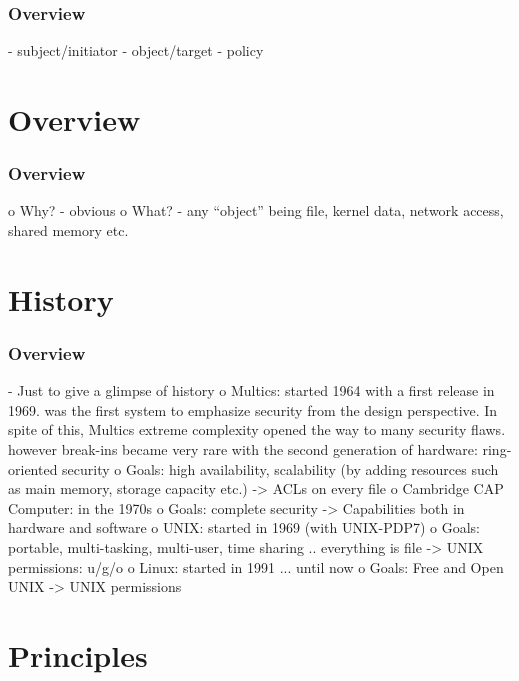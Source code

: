 \begin{frame}
  \frametitle{Overview}

  - subject/initiator
  - object/target
  - policy
\end{frame}

%
%

\section{Overview}


\begin{frame}
  \frametitle{Overview}

  o Why?
    - obvious
  o What?
    - any ``object'' being file, kernel data, network access, shared memory etc.
\end{frame}

%
%

\section{History}


\begin{frame}
  \frametitle{Overview}

  - Just to give a glimpse of history
  o Multics: started 1964 with a first release in 1969.
             was the first system to emphasize security from the design perspective. In spite of this,
             Multics extreme complexity opened the way to many security flaws.
             however break-ins became very rare with the second generation of hardware: ring-oriented security
    o Goals: high availability, scalability (by adding resources such as main memory, storage capacity etc.)
             -> ACLs on every file
  o Cambridge CAP Computer: in the 1970s
    o Goals: complete security
             -> Capabilities both in hardware and software
  o UNIX: started in 1969 (with UNIX-PDP7)
    o Goals: portable, multi-tasking, multi-user, time sharing .. everything is file
             -> UNIX permissions: u/g/o
  o Linux: started in 1991 ... until now
    o Goals: Free and Open UNIX
             -> UNIX permissions
\end{frame}

%
%

\section{Principles}

